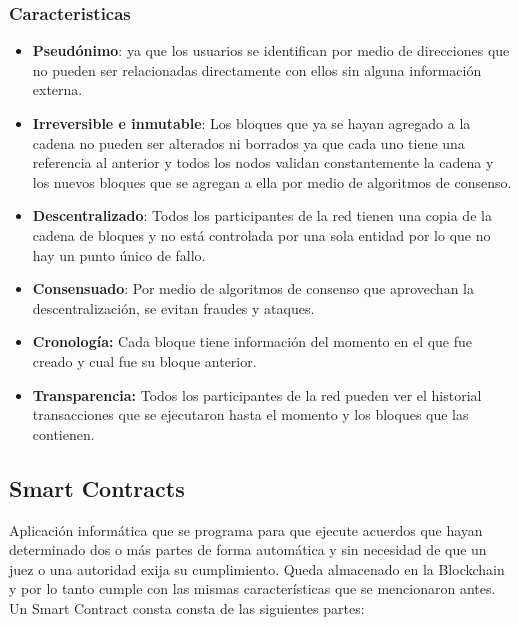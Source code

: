 \documentclass[
11pt, %
oneside, %
spanish, %
singlespacing, %
parskip, %
headsepline, %
chapterinoneline, %
]{MastersDoctoralThesis} %
\begin{document}
\subsubsection*{Caracteristicas}
\begin{itemize}
\item \textbf{Pseudónimo}: ya que los usuarios se identifican por medio de direcciones que no pueden ser relacionadas directamente con ellos sin alguna información externa.
\item \textbf{Irreversible e inmutable}: Los bloques que ya se hayan agregado a la cadena no pueden ser alterados ni borrados ya que cada uno tiene una referencia al anterior y todos los nodos validan constantemente la cadena y los nuevos bloques que se agregan a ella por medio de algoritmos de consenso.
\item \textbf{Descentralizado}: Todos los participantes de la red tienen una copia de la cadena de bloques y no está controlada por una sola entidad por lo que no hay un punto único de fallo.
\item \textbf{Consensuado}: Por medio de algoritmos de consenso que aprovechan la descentralización, se evitan fraudes y ataques.
\item \textbf{Cronología:} Cada bloque tiene información del momento en el que fue creado y cual fue su bloque anterior.
\item \textbf{Transparencia:} Todos los participantes de la red pueden ver el historial transacciones que se ejecutaron hasta el momento y los bloques que las contienen.
\end{itemize}

\subsection{Smart Contracts}
Aplicación informática que se programa para que ejecute acuerdos que hayan determinado dos o más partes de forma automática y sin necesidad de que un juez o una autoridad exija su cumplimiento.
Queda almacenado en la Blockchain y por lo tanto cumple con las mismas características que se mencionaron antes.
Un Smart Contract consta consta de las siguientes partes:
\end{document}

